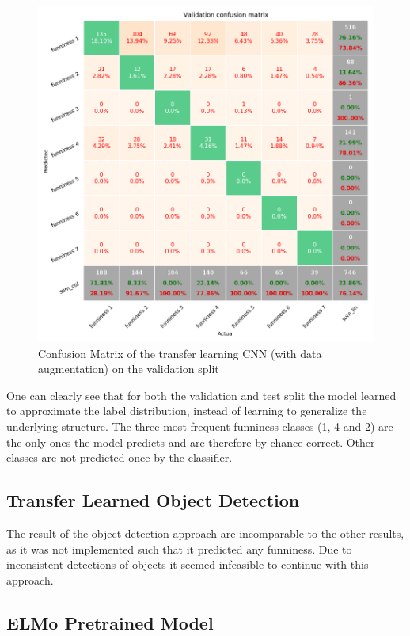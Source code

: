 \documentclass[draft,final,oneside]{vutinfth} %
\begin{document}
\begin{figure}
	\centering
  	\includegraphics[width=1.0\textwidth]{graphics/transfer_confusion_val.png}
	\caption{Confusion Matrix of the transfer learning CNN (with data augmentation) on the validation split}
	\label{fig:confusionmatrixtransferlearningval}
\end{figure}

One can clearly see that for both the validation and test split the model learned to approximate the label distribution, instead of learning to generalize the underlying structure. The three most frequent funniness classes (1, 4 and 2) are the only ones the model predicts and are therefore by chance correct. Other classes are not predicted once by the classifier.


\subsection{Transfer Learned Object Detection}

The result of the object detection approach are incomparable to the other results, as it was not implemented such that it predicted any funniness. Due to inconsistent detections of objects it seemed infeasible to continue with this approach.

\subsection{ELMo Pretrained Model}
\end{document}
